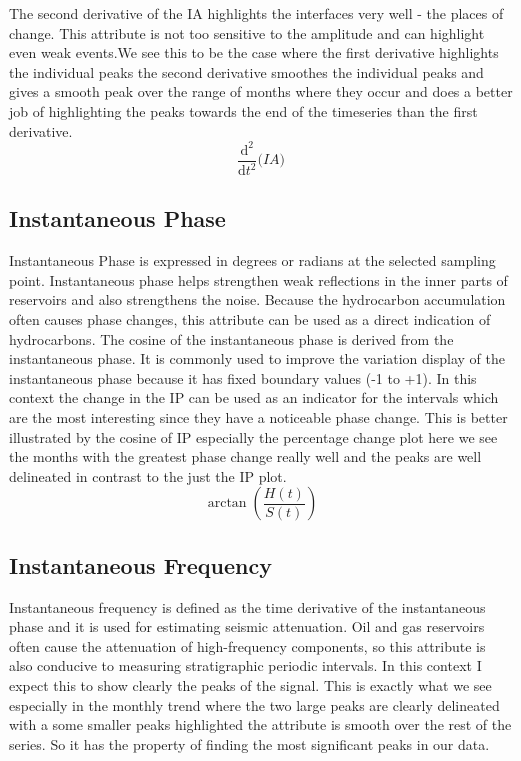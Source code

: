 The second derivative of the IA highlights the interfaces very well - the places of change. This attribute is not too sensitive to the amplitude and can highlight even weak events.We see this to be the case where the first derivative highlights the individual peaks the second derivative smoothes the individual peaks and gives a smooth peak over the range of months where they occur and does a better job of highlighting the peaks towards the end of the timeseries than the first derivative.\\

\begin{equation}
    \frac{\mathrm d^2}{\mathrm d t^2} \big( IA \big)
\end{equation}

\subsection{Instantaneous Phase}

Instantaneous Phase is expressed in degrees or radians at the selected sampling point. Instantaneous phase helps strengthen weak reflections in the inner parts of reservoirs and also strengthens the noise. Because the hydrocarbon accumulation often causes phase changes, this attribute can be used as a direct indication of hydrocarbons. The cosine of the instantaneous phase is derived from the instantaneous phase. It is commonly used to improve the variation display of the instantaneous phase because it has fixed boundary values (-1 to +1). In this context the change in the IP can be used as an indicator for the intervals which are the most interesting since they have a noticeable phase change. This is better illustrated by the cosine of IP especially the percentage change plot here we see the months with the greatest phase change really well and the peaks are well delineated in contrast to the just the IP plot. \\

\begin{equation}
    \arctan(\frac{H(t)}{S(t)})
\end{equation}

\subsection{Instantaneous Frequency}

Instantaneous frequency is defined as the time derivative of the instantaneous phase and it is used for estimating seismic attenuation. Oil and gas reservoirs often cause the attenuation of high-frequency components, so this attribute is also conducive to measuring stratigraphic periodic intervals. In this context I expect this to show clearly the peaks of the signal. This is exactly what we see especially in the monthly trend where the two large peaks are clearly delineated with a some smaller peaks highlighted the attribute is smooth over the rest of the series. So it has the property of finding the most significant peaks in our data.\\

